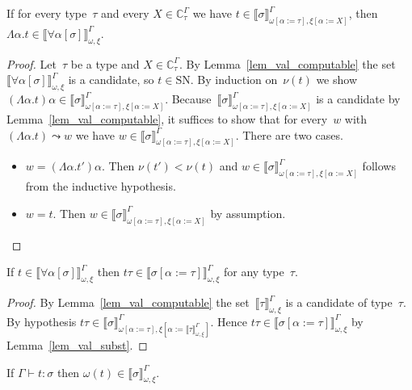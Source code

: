\documentclass[runningheads,a4paper]{llncs}
\newcommand{\subst}[2]{#1:=#2}
\newcommand{\SN}{\mathrm{SN}}
\newcommand{\Cb}{\mathbb{C}}
\newcommand{\val}[3]{\ensuremath{\llbracket#1\rrbracket_{#2}^{#3}}}
\newcommand{\proves}{\vdash}
\begin{document}
\begin{lemma}
  If for every type~$\tau$ and every $X \in \Cb_\tau^\Gamma$ we have
  $t \in
  \val{\sigma}{\omega[\subst{\alpha}{\tau}],\xi[\subst{\alpha}{X}]}{\Gamma}$,
  then
  $\Lambda \alpha . t \in
  \val{\forall\alpha[\sigma]}{\omega,\xi}{\Gamma}$.
\end{lemma}

\begin{proof}
  Let~$\tau$ be a type and $X \in \Cb_\tau^\Gamma$. By
  Lemma~\ref{lem_val_computable} the
  set~$\val{\forall\alpha[\sigma]}{\omega,\xi}{\Gamma}$ is a
  candidate, so $t \in \SN$. By induction on~$\nu(t)$ we show
  $(\Lambda \alpha . t) \alpha \in
  \val{\sigma}{\omega[\subst{\alpha}{\tau}],\xi[\subst{\alpha}{X}]}{\Gamma}$.
  Because~$\val{\sigma}{\omega[\subst{\alpha}{\tau}],\xi[\subst{\alpha}{X}]}{\Gamma}$
  is a candidate by Lemma~\ref{lem_val_computable}, it suffices to
  show that for every~$w$ with $(\Lambda \alpha . t) \leadsto w$ we
  have
  $w \in
  \val{\sigma}{\omega[\subst{\alpha}{\tau}],\xi[\subst{\alpha}{X}]}{\Gamma}$. There
  are two cases.
  \begin{itemize}
  \item $w = (\Lambda \alpha . t') \alpha$. Then $\nu(t') < \nu(t)$
    and
    $w \in
    \val{\sigma}{\omega[\subst{\alpha}{\tau}],\xi[\subst{\alpha}{X}]}{\Gamma}$
    follows from the inductive hypothesis.
  \item $w = t$. Then
    $w \in
    \val{\sigma}{\omega[\subst{\alpha}{\tau}],\xi[\subst{\alpha}{X}]}{\Gamma}$
    by assumption.
  \end{itemize}
\end{proof}

\begin{lemma}
  If $t \in \val{\forall\alpha[\sigma]}{\omega,\xi}{\Gamma}$ then
  $t \tau \in \val{\sigma[\subst{\alpha}{\tau}]}{\omega,\xi}{\Gamma}$
  for any type~$\tau$.
\end{lemma}

\begin{proof}
  By Lemma~\ref{lem_val_computable} the
  set~$\val{\tau}{\omega,\xi}{\Gamma}$ is a candidate of
  type~$\tau$. By hypothesis
  $t \tau \in
  \val{\sigma}{\omega[\subst{\alpha}{\tau}],\xi[\subst{\alpha}{\val{\tau}{\omega,\xi}{\Gamma}}]}{\Gamma}$. Hence
  $t \tau \in \val{\sigma[\subst{\alpha}{\tau}]}{\omega,\xi}{\Gamma}$
  by Lemma~\ref{lem_val_subst}.
\end{proof}

\begin{lemma}\label{lem_typable_computable}
  If $\Gamma \proves t : \sigma$ then
  $\omega(t) \in \val{\sigma}{\omega,\xi}{\Gamma}$.
\end{lemma}
\end{document}
